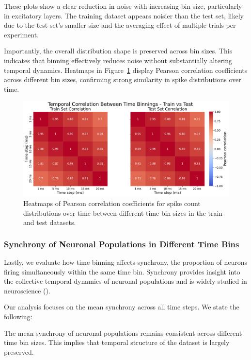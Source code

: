 These plots show a clear reduction in noise with increasing bin size, particularly in excitatory layers. The training dataset appears noisier than the test set, likely due to the test set's smaller size and the averaging effect of multiple trials per experiment.

Importantly, the overall distribution shape is preserved across bin sizes. This indicates that binning effectively reduces noise without substantially altering temporal dynamics. Heatmaps in Figure~\ref{fig:correlation_time_bin_size} display Pearson correlation coefficients across different bin sizes, confirming strong similarity in spike distributions over time.

\begin{figure}
    \centering
    \includegraphics[width=\linewidth]{img/plots/temporal_correlation_time_bin_size.pdf}
    \caption{Heatmaps of Pearson correlation coefficients for spike count distributions over time between different time bin sizes in the train and test datasets.}
    \label{fig:correlation_time_bin_size}
\end{figure}

\subsubsection{Synchrony of Neuronal Populations in Different Time Bins}
\label{subsubsec:neuron_synchrony_binning}

Lastly, we evaluate how time binning affects synchrony, the proportion of neurons firing simultaneously within the same time bin. Synchrony provides insight into the collective temporal dynamics of neuronal populations and is widely studied in neuroscience (\citet{Singer1999}).

Our analysis focuses on the mean synchrony across all time steps. We state the following:

\begin{claim}
    The mean synchrony of neuronal populations remains consistent across different time bin sizes. This implies that temporal structure of the dataset is largely preserved.
\end{claim}
\label{claim:synchrony_time_bins_size}

